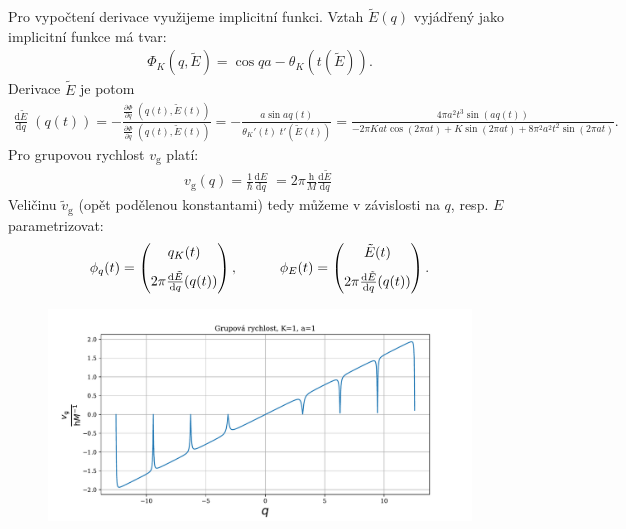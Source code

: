 \documentclass[10pt,a4paper]{article}
\newcommand{\const}[1]{\text{#1}}
\newcommand{\mat}[1]{
    \begin{pmatrix}
        #1
    \end{pmatrix}
}
\newcommand{\dd}[2]{\frac{\const{d} #1}{\const{d} #2} \;}
\newcommand{\pd}[2]{\frac{\partial  #1}{\partial  #2} \;}
\begin{document}
Pro vypočtení derivace využijeme implicitní funkci. Vztah $\tilde{E}(q)$ vyjádřený jako implicitní funkce má tvar:
\begin{gather*}
    \Phi_K(q, \tilde{E}) =
    \cos{qa} - \theta_K(t(\tilde{E})).
\end{gather*}
Derivace $\tilde{E}$ je potom
\begin{gather*}
    \dd{\tilde{E}}{q}(q(t)) =
    - \frac{\pd{\Phi}{q}(q(t), \tilde{E}(t))}{\pd{\Phi}{q}(q(t), \tilde{E}(t))} =
    - \frac{a \sin aq(t)}{\theta_K'(t) \; t'(\tilde{E}(t))}
    = \frac{4 \pi a^{2} t^{3} \sin{\left(a q(t) \right)}}{- 2 \pi K a t \cos{\left(2 \pi a t \right)} + K \sin{\left(2 \pi a t \right)} + 8 \pi^{2} a^{2} t^{2} \sin{\left(2 \pi a t \right)}}.
\end{gather*}
Pro grupovou rychlost $v_\const{g}$ platí:
\begin{gather*}
    v_\const{g}(q) = \frac{1}{\hbar} \dd{E}{q} = 2 \pi \frac{\const{h}}{M} \dd{\tilde{E}}{q}
\end{gather*}
Veličinu $\tilde{v}_\const{g}$ (opět podělenou konstantami) tedy můžeme v závislosti na $q$, resp. $E$ parametrizovat:
\begin{gather*}
    \phi_q(t) = \mat{
        q_K(t) \\[7pt]
        2 \pi \dd{\tilde{E}}{q}\hspace{-3pt}(q(t))
    },
    \hspace{3em}
    \phi_E(t) = \mat{
        \tilde{E}(t) \\[7pt]
        2 \pi \dd{\tilde{E}}{q}\hspace{-3pt}(q(t))
    }.
\end{gather*}
\begin{figure}[!ht]
    \centering
    \includegraphics[scale=0.65]{grupova1_q.pdf}
\end{figure}
\end{document}
